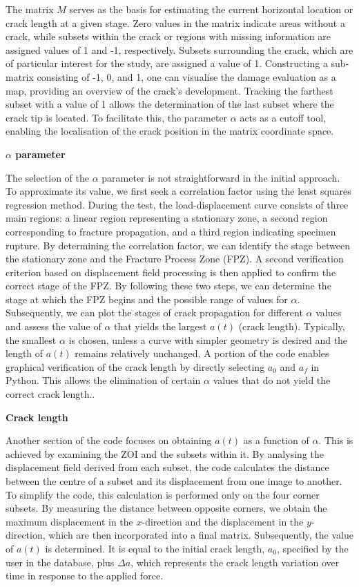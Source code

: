 The matrix $M$ serves as the basis for estimating the current horizontal location or crack length at a given stage. Zero values in the matrix indicate areas without a crack, while subsets within the crack or regions with missing information are assigned values of 1 and -1, respectively. Subsets surrounding the crack, which are of particular interest for the study, are assigned a value of 1. Constructing a sub-matrix consisting of -1, 0, and 1, one can visualise the damage evaluation as a map, providing an overview of the crack's development. Tracking the farthest subset with a value of 1 allows the determination of the last subset where the crack tip is located. To facilitate this, the parameter $\alpha$ acts as a cutoff tool, enabling the localisation of the crack position in the matrix coordinate space.

\textbf{$\alpha$ parameter}

The selection of the $\alpha$ parameter is not straightforward in the initial approach. To approximate its value, we first seek a correlation factor using the least squares regression method. During the test, the load-displacement curve consists of three main regions: a linear region representing a stationary zone, a second region corresponding to fracture propagation, and a third region indicating specimen rupture. By determining the correlation factor, we can identify the stage between the stationary zone and the Fracture Process Zone (FPZ). A second verification criterion based on displacement field processing is then applied to confirm the correct stage of the FPZ. By following these two steps, we can determine the stage at which the FPZ begins and the possible range of values for $\alpha$. Subsequently, we can plot the stages of crack propagation for different $\alpha$ values and assess the value of $\alpha$ that yields the largest $a(t)$ (crack length). Typically, the smallest $\alpha$ is chosen, unless a curve with simpler geometry is desired and the length of $a(t)$ remains relatively unchanged. A portion of the code enables graphical verification of the crack length by directly selecting $a_0$ and $a_f$ in Python. This allows the elimination of certain $\alpha$ values that do not yield the correct crack length..

\textbf{Crack length}

Another section of the code focuses on obtaining $a(t)$ as a function of $\alpha$. This is achieved by examining the ZOI and the subsets within it. By analysing the displacement field derived from each subset, the code calculates the distance between the centre of a subset and its displacement from one image to another. To simplify the code, this calculation is performed only on the four corner subsets. By measuring the distance between opposite corners, we obtain the maximum displacement in the $x$-direction and the displacement in the $y$-direction, which are then incorporated into a final matrix. Subsequently, the value of $a(t)$ is determined. It is equal to the initial crack length, $a_0$, specified by the user in the database, plus $\Delta a$, which represents the crack length variation over time in response to the applied force.


